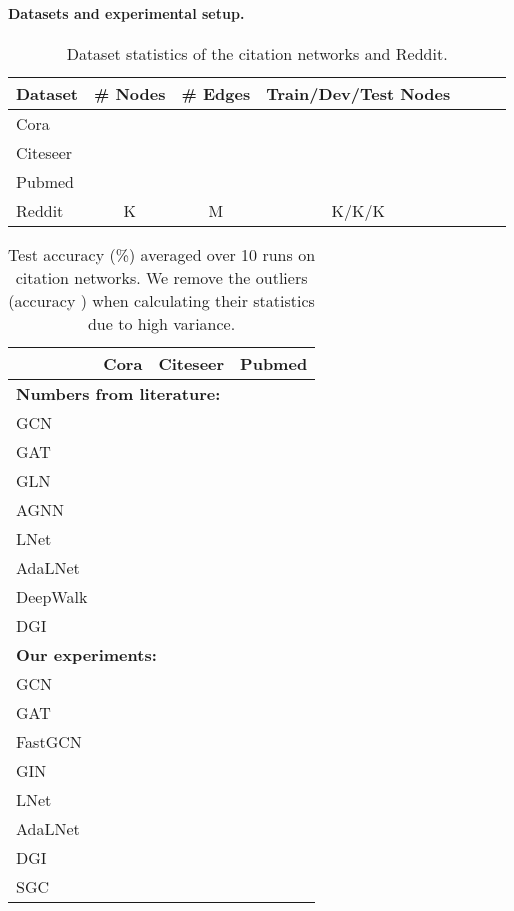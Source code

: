 \documentclass{article}
\newcommand{\method}{SGC}
\begin{document}
\paragraph{Datasets and experimental setup.}
\begin{table}[tb!]
\small
\centering
\caption{Dataset statistics of the citation networks and Reddit.}
\label{table:citation-dataset}
\begin{tabular}{l|cccccc}
\toprule
Dataset & \# Nodes & \# Edges & Train/Dev/Test Nodes \\
\midrule
Cora &  &  & \\
Citeseer &  &  & \\
Pubmed &  &  & \\
\midrule
Reddit & K & M & K/K/K\\
\bottomrule
\end{tabular}
\end{table}
\begin{table}[htb!]
\centering
        \small
        \caption{Test accuracy (\%) averaged over 10 runs on citation networks. We remove the outliers (accuracy ) when calculating their statistics due to high variance.}
        \label{table:citation-base}
        \begin{tabular}{l|c|c|c}
        \toprule
         & Cora & Citeseer & Pubmed \\ 
        \midrule
        \multicolumn{4}{l}{\textbf{Numbers from literature:}} \\
GCN  &  &  &   \\
        GAT  &  &  &  \\
        GLN  &  &  &  \\
        AGNN &  &  &  \\
        LNet &  &   &  \\
        AdaLNet &  &   &  \\
        DeepWalk &  &  & \\
        DGI &  &  &  \\
         \midrule
        \multicolumn{4}{l}{\textbf{Our experiments:}} \\
GCN &  &  &  \\
GAT &  &  &   \\
        FastGCN &  &  &  \\
        GIN &  &   &  \\
        LNet &  &   &  \\
        AdaLNet &  &  &  \\
        DGI &  &  & \\
        {\color{modelblue} \method{}} &  &  &  \\
         \bottomrule
        \end{tabular}
\end{table}
\end{document}
